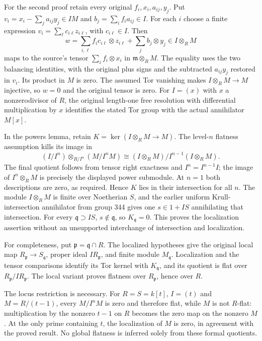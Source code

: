 For the second proof retain every original \(f_i,x_i,a_{ij},y_j\). Put \(v_i=x_i-\sum_j a_{ij}y_j\in IM\) and \(b_j=\sum_i f_i a_{ij}\in I\). For each \(i\) choose a finite expression \(v_i=\sum_\ell c_{i\ell}z_{i\ell}\), with \(c_{i\ell}\in I\). Then \[
w=\sum_{i,\ell}f_ic_{i\ell}\otimes z_{i\ell}
       +\sum_j b_j\otimes y_j\in I\otimes_RM
\] maps to the source's tensor \(\sum_i f_i\otimes x_i\) in \(\mathfrak m\otimes_RM\). The equality uses the two balancing identities, with the original plus signs and the subtracted \(a_{ij}y_j\) restored in \(v_i\). Its product in \(M\) is zero. The assumed Tor vanishing makes \(I\otimes_RM\to M\) injective, so \(w=0\) and the original tensor is zero. For \(I=(x)\) with \(x\) a nonzerodivisor of \(R\), the original length-one free resolution with differential multiplication by \(x\) identifies the stated Tor group with the actual annihilator \(M[x]\).

In the powers lemma, retain \(K=\ker(I\otimes_RM\to M)\). The level-\(n\) flatness assumption kills its image in \[
(I/I^n)\otimes_{R/I^n}(M/I^nM)
 \cong (I\otimes_RM)/I^{n-1}(I\otimes_RM).
\] The final quotient follows from tensor right exactness and \(I^n=I^{n-1}I\); the image of \(I^n\otimes_RM\) is precisely the displayed power submodule. At \(n=1\) both descriptions are zero, as required. Hence \(K\) lies in their intersection for all \(n\). The module \(I\otimes_RM\) is finite over Noetherian \(S\), and the earlier uniform Krull-intersection annihilator from group 344 gives one \(s\in1+IS\) annihilating that intersection. For every \(\mathfrak q\supset IS\), \(s\notin\mathfrak q\), so \(K_{\mathfrak q}=0\). This proves the localization assertion without an unsupported interchange of intersection and localization.

For completeness, put \(\mathfrak p=\mathfrak q\cap R\). The localized hypotheses give the original local map \(R_{\mathfrak p}\to S_{\mathfrak q}\), proper ideal \(IR_{\mathfrak p}\), and finite module \(M_{\mathfrak q}\). Localization and the tensor comparisons identify its Tor kernel with \(K_{\mathfrak q}\), and its quotient is flat over \(R_{\mathfrak p}/IR_{\mathfrak p}\). The local variant proves flatness over \(R_{\mathfrak p}\), hence over \(R\).

The locus restriction is necessary. For \(R=S=k[t]\), \(I=(t)\) and \(M=R/(t-1)\), every \(M/I^nM\) is zero and therefore flat, while \(M\) is not \(R\)-flat: multiplication by the nonzero \(t-1\) on \(R\) becomes the zero map on the nonzero \(M\). At the only prime containing \(t\), the localization of \(M\) is zero, in agreement with the proved result. No global flatness is inferred solely from these formal quotients.

